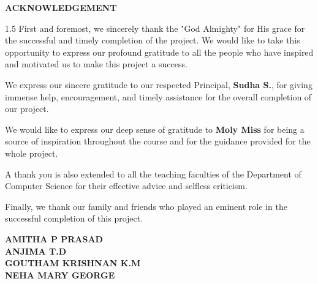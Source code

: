 \documentclass[12pt, a4paper, oneside]{report}
\begin{document}
\begin{center}
    {\Large \textbf{ACKNOWLEDGEMENT} \par}
\end{center}
\vspace{1cm}
\begin{spacing}{1.5}
First and foremost, we sincerely thank the "God Almighty" for His grace for the successful and timely completion of the project. We would like to take this opportunity to express our profound gratitude to all the people who have inspired and motivated us to make this project a success.

We express our sincere gratitude to our respected Principal, \textbf{Sudha S.}, for giving immense help, encouragement, and timely assistance for the overall completion of our project.

We would like to express our deep sense of gratitude to \textbf{Moly Miss} for being a source of inspiration throughout the course and for the guidance provided for the whole project.

A thank you is also extended to all the teaching faculties of the Department of Computer Science for their effective advice and selfless criticism. 

Finally, we thank our family and friends who played an eminent role in the successful completion of this project.
\end{spacing}
\vspace{1cm}
\begin{flushright}
    \textbf{AMITHA P PRASAD} \\
    \textbf{ANJIMA T.D} \\
    \textbf{GOUTHAM KRISHNAN K.M} \\
    \textbf{NEHA MARY GEORGE}
\end{flushright}
\newpage
\end{document}
